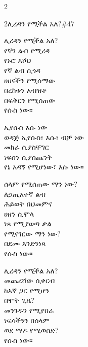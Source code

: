 \begin{multicols}{2}
\begin{hymn}{2}{ሊረዳን የሚችል አለ?}{\#47}
\begin{stanza}
ሊረዳን የሚችል አለ?\\
የኛን ልብ የሚረዳ\\
የኑሮ እሾህ\\
የኛ ልብ ሲጎዳ\\
ሀዘናችን የሚሰማው\\
በረከቱን አብዝቶ\\
በፍቅርን የሚሰጠው\\
የሱስ ነው።
\end{stanza}
\begin{chorus}
ኢየሱስ እሱ ነው\\
ወዳጅ ኢየሱስ፣ እሱ፣ ብቻ ነው\\
መከራ ሲያስቸግር\\
ነፍስን ሲያስጨንቅ\\
የኔ አዳኝ የሚሆነው፣ እሱ ነው።
\end{chorus}
\begin{stanza}
ሰላም የሚሰጠው ማን ነው?\\
ለኃጢአተኛ ልብ\\
ሕይወት በህመምና\\
ሀዘን ሲሞላ\\
ነጻ የሚያወጣ ቃል\\
የሚናገርው ማን ነው?\\
በደሙ እንድንነጻ\\
የሱስ ነው።
\end{stanza}
\begin{stanza}
ሊረዳን የሚችል አለ?\\
መጨረሻው ሲቀርብ\\
ከእኛ ጋር የሚሆን\\
በሞት ጊዜ?\\
መንገዱን የሚያበራ\\
ነፍሳችንን በሰላም\\
ወደ ማዶ የሚወስድ?\\
የሱስ ነው።
\end{stanza}
\end{hymn}


\end{multicols}

